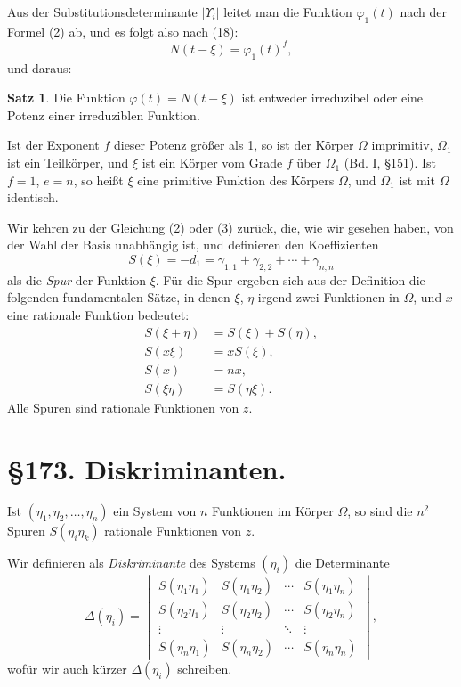 \documentclass[12pt,a4paper]{article}
\theoremstyle{definition}
\newtheorem{satz}{Satz}[section]
\begin{document}
Aus der Substitutionsdeterminante $|\Upsilon_i|$ leitet man die Funktion $\varphi_1(t)$ nach der Formel (2) ab, und es folgt also nach (18):
\begin{equation}
N(t - \xi) = \varphi_1(t)^f,
\end{equation}
und daraus:

\begin{satz}
Die Funktion $\varphi(t) = N(t - \xi)$ ist entweder irreduzibel oder eine Potenz einer irreduziblen Funktion.
\end{satz}

Ist der Exponent $f$ dieser Potenz größer als 1, so ist der Körper $\Omega$ imprimitiv, $\Omega_1$ ist ein Teilkörper, und $\xi$ ist ein Körper vom Grade $f$ über $\Omega_1$ (Bd. I, \S 151). Ist $f = 1$, $e = n$, so heißt $\xi$ eine primitive Funktion des Körpers $\Omega$, und $\Omega_1$ ist mit $\Omega$ identisch.

Wir kehren zu der Gleichung (2) oder (3) zurück, die, wie wir gesehen haben, von der Wahl der Basis unabhängig ist, und definieren den Koeffizienten
\begin{equation}
S(\xi) = -d_1 = \gamma_{1,1} + \gamma_{2,2} + \cdots + \gamma_{n,n}
\end{equation}
als die \emph{Spur} der Funktion $\xi$. Für die Spur ergeben sich aus der Definition die folgenden fundamentalen Sätze, in denen $\xi$, $\eta$ irgend zwei Funktionen in $\Omega$, und $x$ eine rationale Funktion bedeutet:
\begin{align}
S(\xi + \eta) &= S(\xi) + S(\eta), \\
S(x\xi) &= xS(\xi), \\
S(x) &= nx, \\
S(\xi\eta) &= S(\eta\xi).
\end{align}
Alle Spuren sind rationale Funktionen von $z$.

\newpage
\section*{\S 173. Diskriminanten.}

Ist $(\eta_1, \eta_2, \ldots, \eta_n)$ ein System von $n$ Funktionen im Körper $\Omega$, so sind die $n^2$ Spuren $S(\eta_i\eta_k)$ rationale Funktionen von $z$.

Wir definieren als \emph{Diskriminante} des Systems $(\eta_i)$ die Determinante
\[\Delta(\eta_i) = \begin{vmatrix}
S(\eta_1\eta_1) & S(\eta_1\eta_2) & \cdots & S(\eta_1\eta_n) \\
S(\eta_2\eta_1) & S(\eta_2\eta_2) & \cdots & S(\eta_2\eta_n) \\
\vdots & \vdots & \ddots & \vdots \\
S(\eta_n\eta_1) & S(\eta_n\eta_2) & \cdots & S(\eta_n\eta_n)
\end{vmatrix},\]
wofür wir auch kürzer $\Delta(\eta_i)$ schreiben.
\end{document}
